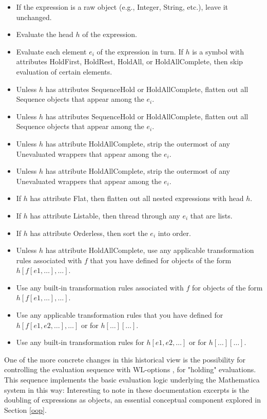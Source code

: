 \begin{displayquote}
\begin{itemize}
    \item If the expression is a raw object (e.g., Integer, String, etc.), leave it unchanged.
    \item Evaluate the head \(h\) of the expression.
    \item Evaluate each element \(e_i\) of the expression in turn. If \(h\) is a symbol with attributes HoldFirst, HoldRest, HoldAll, or HoldAllComplete, then skip evaluation of certain elements.
    \item Unless \(h\) has attributes SequenceHold or HoldAllComplete, flatten out all Sequence objects that appear among the \(e_i\).
    \item Unless \(h\) has attributes SequenceHold or HoldAllComplete, flatten out all Sequence objects that appear among the \(e_i\).
    \item Unless \(h\) has attribute HoldAllComplete, strip the outermost of any Unevaluated wrappers that appear among the \(e_i\).
    \item Unless \(h\) has attribute HoldAllComplete, strip the outermost of any Unevaluated wrappers that appear among the \(e_i\).
    \item If \(h\) has attribute Flat, then flatten out all nested expressions with head \(h\).
    \item If \(h\) has attribute Listable, then thread through any \(e_i\) that are lists.
    \item If \(h\) has attribute Orderless, then sort the \(e_i\) into order.
    \item Unless \(h\) has attribute HoldAllComplete, use any applicable transformation rules associated with \(f\) that you have defined for objects of the form \(h[f[e1,…],…]\).
    \item Use any built‐in transformation rules associated with \(f\) for objects of the form \(h[f[e1,…],…]\).
    \item Use any applicable transformation rules that you have defined for \(h[f[e1,e2,…],…]\) or for \(h[…][…]\).
    \item Use any built‐in transformation rules for \(h[e1,e2,…]\) or for \(h[…][…]\).
\end{itemize}
\cite[The Standard Evaluation Sequence]{noauthor_evaluationwolfram_nodate}
\end{displayquote}

One of the more concrete changes in this historical view is the possibility for controlling the evaluation sequence with WL-options \cite{noauthor_optionswolfram_nodate}, for "holding" evaluations. This sequence implements the basic evaluation logic underlying the Mathematica system in this way: Interesting to note in these documentation excerpts is the doubling of expressions as objects, an essential conceptual component explored in Section \ref{oop}.


